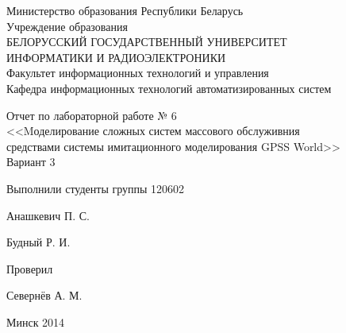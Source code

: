 \thispagestyle{empty}
\setlength{\parindent}{0ex} %

\begin{center}
  Министерство образования Республики Беларусь \\
  \vspace{0.5ex}
  Учреждение образования \\
  БЕЛОРУССКИЙ ГОСУДАРСТВЕННЫЙ УНИВЕРСИТЕТ \\
  ИНФОРМАТИКИ И РАДИОЭЛЕКТРОНИКИ \\
  \vspace{0.5ex}
  Факультет информационных технологий и управления \\
  \vspace{0.5ex}
  Кафедра информационных технологий автоматизированных систем
\end{center}

\vspace{50mm}

\begin{center}
  Отчет по лабораторной работе № 6 \\
  <<Mоделирование сложных систем массового обслуживния \\
  средствами системы имитационного моделирования GPSS World>> \\
  Вариант 3
\end{center}

\vspace{40mm}

\begin{minipage}{.65\linewidth}
    Выполнили студенты группы 120602
    \bigskip
\end{minipage}
\hfill
\begin{minipage}{.25\linewidth}
  \begin{flushleft}
    Анашкевич П. С.

    Будный Р. И.
  \end{flushleft}
\end{minipage}

\vspace{10mm}

\begin{minipage}{.65\linewidth}
    Проверил
\end{minipage}
\hfill
\begin{minipage}{.25\linewidth}
  \begin{flushleft}
    Севернёв А. М.

  \end{flushleft}
\end{minipage}

\vspace{40mm}
\begin{center}
  Минск 2014
\end{center}

\setlength{\parindent}{5ex} %

\newpage
